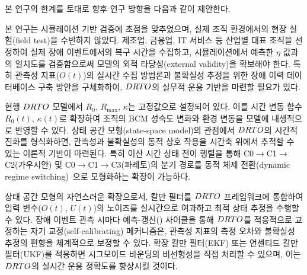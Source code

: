 \section{}
\label{sec:conclusion-future}

본 연구의 한계를 토대로  향후 연구 방향을 다음과 같이 제안한다.


본 연구는 시뮬레이션 기반 검증에 초점을 맞추었으며, 실제 조직 환경에서의
현장 실험(field test)을 수반하지 않았다.
제조업, 금융업, IT 서비스 등 산업별 대표 조직을 선정하여
실제 장애 이벤트에서의 복구 시간을 수집하고,
시뮬레이션에서 예측한 $\eta$ 값과의 일치도를 검증함으로써
모델의 외적 타당성(external validity)을 확보해야 한다.
특히 관측성 지표($O(t)$)의 실시간 수집 방법론과
불확실성 추정을 위한 장애 이력 데이터베이스 구축 방안을 구체화하여,
$DRTO$의 실무적 운용 기반을 마련할 필요가 있다.


현행 $DRTO$ 모델에서 $R_0$, $R_{\max}$, $\kappa$는 고정값으로 설정되어 있다.
이를 시간 변동 함수\chg{(}$R_0(t)$, $\kappa(t)$\chg{)}로 확장하여
조직의 BCM 성숙도 변화와 환경 변동을 모델에 내생적으로 반영할 수 있다.
상태 공간 모형(state-space model)의 관점에서 $DRTO$의 시간적 진화를
형식화하면, 관측성과 불확실성의 동적 상호 작용을
시간축 위에서 추적할 수 있는 이론적 기반이 마련된다.
특히 이산 시간 상태 전이 행렬을 통해
C0$\to$C1$\to$C2(가우시안) 및 C0$\to$C1$\to$C3(파레토)의
분기 경로를 동적 체제 전환(dynamic regime switching)~\citep{hamilton1989regime}으로
모형화하는 확장이 가능하다.


상태 공간 모형의 자연스러운 확장으로서, 칼만 필터를 $DRTO$ 프레임워크에
통합하여 입력 변수($O(t)$, $U(t)$)의 노이즈를 실시간으로 여과하고
최적 상태 추정을 수행할 수 있다.
장애 이벤트 관측 시마다 예측-갱신() 사이클을 통해
$DRTO$를 적응적으로 교정하는 자기 교정(self-calibrating) 메커니즘은,
관측성 지표의 측정 오차와 불확실성 추정의 편향을 체계적으로 보정할 수 있다.
확장 칼만 필터(EKF) 또는 언센티드 칼만 필터(UKF)를 적용하면
시그모이드 바운딩의 비선형성을 직접 처리할 수 있으며,
이는 $DRTO$의 실시간 운용 정확도를 향상시킬 것이다.




